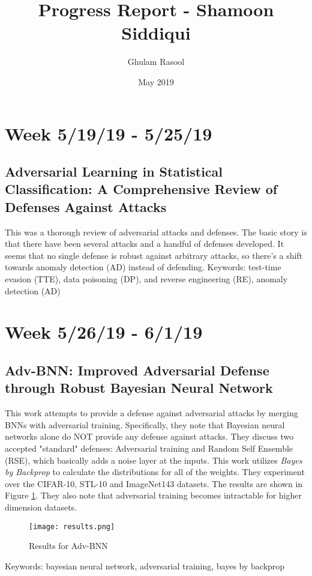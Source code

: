 \documentclass{article}
\title{Progress Report - Shamoon Siddiqui}
\author{Ghulam Rasool}
\date{May 2019}
\begin{document}
\maketitle

\section*{Week 5/19/19 - 5/25/19}

\subsection*{Adversarial Learning in Statistical Classification: A
Comprehensive Review of Defenses Against Attacks\citep{miller2019adversarial}}

This was a thorough review of adversarial attacks and defenses. The basic story is that there have been several attacks and a handful of defenses developed. It seems that no single defense is robust against arbitrary attacks, so there's a shift towards anomaly detection (AD) instead of defending.
\newline\newline
Keywords: test-time evasion (TTE), data poisoning (DP), and reverse engineering (RE), anomaly detection (AD)

\section*{Week 5/26/19 - 6/1/19}
\subsection*{Adv-BNN: Improved Adversarial Defense through Robust Bayesian Neural Network\cite{liu2018adv}}

This work attempts to provide a defense against adversarial attacks by merging BNNs with adversarial training. Specifically, they note that Bayesian neural networks alone do NOT provide any defense against attacks. They discuss two accepted "standard" defenses: Adversarial training and Random Self Ensemble (RSE), which basically adds a noise layer at the inputs. This work utilizes \textit{Bayes by Backprop} to calculate the distributions for all of the weights. They experiment over the CIFAR-10, STL-10 and ImageNet143 datasets. The results are shown in Figure \ref{figure1}. They also note that adversarial training becomes intractable for higher dimension datasets.
\begin{figure}
    \centering
    \texttt{[image: results.png]}
    \caption{Results for Adv-BNN}
    \label{figure1}
\end{figure}
\newline\newline
Keywords: bayesian neural network, adversarial training, bayes by backprop
\end{document}
